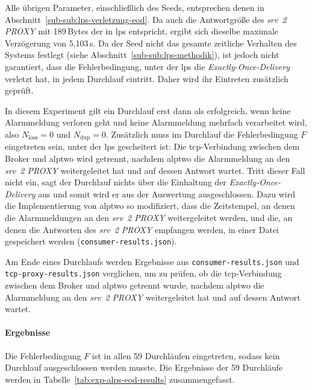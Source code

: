 Alle übrigen Parameter, einschließlich des Seeds, entsprechen denen in Abschnitt~\ref{sub-sub:lps-verletzung-eod}. Da auch die Antwortgröße des \textit{\gls{srv}~2 PROXY} mit 189\,Bytes der in \gls{lps} entspricht, ergibt sich dieselbe maximale Verzögerung von 5{,}103\,s. Da der Seed nicht das gesamte zeitliche Verhalten des Systems festlegt (siehe Abschnitt~\ref{sub-sub:lps-methodik}), ist jedoch nicht garantiert, dass die Fehlerbedingung, unter der \gls{lps} die \textit{Exactly-Once-Delivery} verletzt hat, in jedem Durchlauf eintritt. Daher wird ihr Eintreten zusätzlich geprüft.

In diesem Experiment gilt ein Durchlauf erst dann als erfolgreich, wenn keine Alarmmeldung verloren geht und keine Alarmmeldung mehrfach verarbeitet wird, also $N_{\text{loss}} = 0$ und $N_{\text{dup}} = 0$. Zusätzlich muss im Durchlauf die Fehlerbedingung $F$ eingetreten sein, unter der \gls{lps} gescheitert ist: Die \gls{tcp}-Verbindung zwischen dem Broker und \gls{alptwo} wird getrennt, nachdem \gls{alptwo} die Alarmmeldung an den \textit{\gls{srv}~2 PROXY} weitergeleitet hat und auf dessen Antwort wartet. Tritt dieser Fall nicht ein, sagt der Durchlauf nichts über die Einhaltung der \textit{Exactly-Once-Delivery} aus und somit wird er aus der Auswertung ausgeschlossen. Dazu wird die Implementierung von \gls{alptwo} so modifiziert, dass die Zeitstempel, an denen die Alarmmeldungen an den \textit{\gls{srv}~2 PROXY} weitergeleitet werden, und die, an denen die Antworten des \textit{\gls{srv}~2 PROXY} empfangen werden, in einer Datei gespeichert werden (\texttt{consumer-results.json}).

\newpage

Am Ende eines Durchlaufs werden Ergebnisse aus \texttt{consumer-results.json} und \texttt{tcp-proxy-results.json} verglichen, um zu prüfen, ob die \gls{tcp}-Verbin\-dung zwischen dem Broker und \gls{alptwo} getrennt wurde, nachdem \gls{alptwo} die Alarmmeldung an den \textit{\gls{srv}~2 PROXY} weitergeleitet hat und auf dessen Antwort wartet.

\paragraph{Ergebnisse} Die Fehlerbedingung $F$ ist in allen 59 Durchläufen eingetreten, sodass kein Durchlauf ausgeschlossen werden musste. Die Ergebnisse der 59 Durchläufe werden in Tabelle~\ref{tab:exp-alps-eod-results} zusammengefasst.

